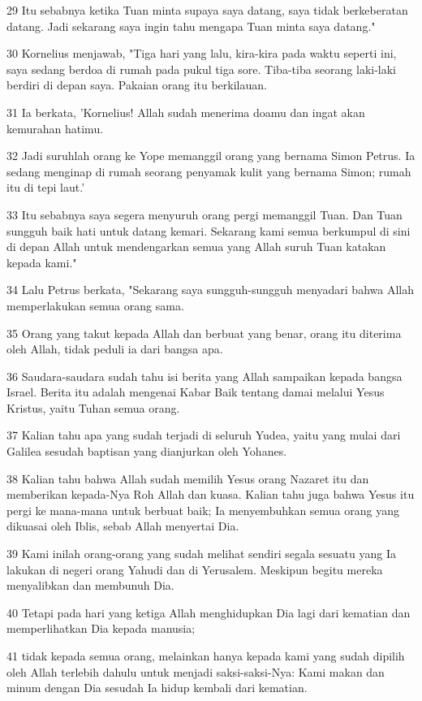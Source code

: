\par 29 Itu sebabnya ketika Tuan minta supaya saya datang, saya tidak berkeberatan datang. Jadi sekarang saya ingin tahu mengapa Tuan minta saya datang."
\par 30 Kornelius menjawab, "Tiga hari yang lalu, kira-kira pada waktu seperti ini, saya sedang berdoa di rumah pada pukul tiga sore. Tiba-tiba seorang laki-laki berdiri di depan saya. Pakaian orang itu berkilauan.
\par 31 Ia berkata, 'Kornelius! Allah sudah menerima doamu dan ingat akan kemurahan hatimu.
\par 32 Jadi suruhlah orang ke Yope memanggil orang yang bernama Simon Petrus. Ia sedang menginap di rumah seorang penyamak kulit yang bernama Simon; rumah itu di tepi laut.'
\par 33 Itu sebabnya saya segera menyuruh orang pergi memanggil Tuan. Dan Tuan sungguh baik hati untuk datang kemari. Sekarang kami semua berkumpul di sini di depan Allah untuk mendengarkan semua yang Allah suruh Tuan katakan kepada kami."
\par 34 Lalu Petrus berkata, "Sekarang saya sungguh-sungguh menyadari bahwa Allah memperlakukan semua orang sama.
\par 35 Orang yang takut kepada Allah dan berbuat yang benar, orang itu diterima oleh Allah, tidak peduli ia dari bangsa apa.
\par 36 Saudara-saudara sudah tahu isi berita yang Allah sampaikan kepada bangsa Israel. Berita itu adalah mengenai Kabar Baik tentang damai melalui Yesus Kristus, yaitu Tuhan semua orang.
\par 37 Kalian tahu apa yang sudah terjadi di seluruh Yudea, yaitu yang mulai dari Galilea sesudah baptisan yang dianjurkan oleh Yohanes.
\par 38 Kalian tahu bahwa Allah sudah memilih Yesus orang Nazaret itu dan memberikan kepada-Nya Roh Allah dan kuasa. Kalian tahu juga bahwa Yesus itu pergi ke mana-mana untuk berbuat baik; Ia menyembuhkan semua orang yang dikuasai oleh Iblis, sebab Allah menyertai Dia.
\par 39 Kami inilah orang-orang yang sudah melihat sendiri segala sesuatu yang Ia lakukan di negeri orang Yahudi dan di Yerusalem. Meskipun begitu mereka menyalibkan dan membunuh Dia.
\par 40 Tetapi pada hari yang ketiga Allah menghidupkan Dia lagi dari kematian dan memperlihatkan Dia kepada manusia;
\par 41 tidak kepada semua orang, melainkan hanya kepada kami yang sudah dipilih oleh Allah terlebih dahulu untuk menjadi saksi-saksi-Nya: Kami makan dan minum dengan Dia sesudah Ia hidup kembali dari kematian.
